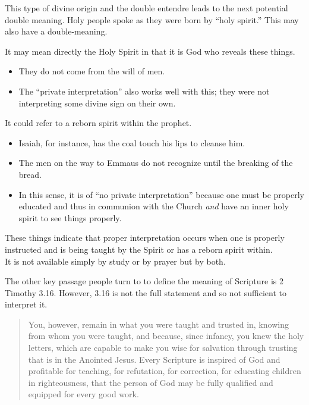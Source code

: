 \documentclass{beamer}
\begin{document}
\begin{frame}
  This type of divine origin and the double entendre leads to the next potential double meaning.
  Holy people spoke as they were born by ``holy spirit.''
  This may also have a double-meaning.
\end{frame}

\begin{frame}
  It may mean directly the Holy Spirit in that it is God who reveals these things.\pause
  \begin{itemize}
	\item They do not come from the will of men.\pause
	\item The ``private interpretation'' also works well with this; they were not interpreting some divine sign on their own.
  \end{itemize}
\end{frame}

\begin{frame}
  It could refer to a reborn spirit within the prophet.\pause
  \begin{itemize}
	\item Isaiah, for instance, has the coal touch his lips to cleanse him.\pause
	\item The men on the way to Emmaus do not recognize until the breaking of the bread.\pause
	\item In this sense, it is of ``no private interpretation'' because one must be properly educated and thus in communion with the Church \emph{and} have an inner holy spirit to see things properly.
  \end{itemize}
\end{frame}

\begin{frame}
  These things indicate that proper interpretation occurs when one is properly instructed and is being taught by the Spirit or has a reborn spirit within.\\ \pause
  It is not available simply by study or by prayer but by both.
\end{frame}

\begin{frame}
  The other key passage people turn to to define the meaning of Scripture is 2 Timothy 3.16.
  However, 3.16 is not the full statement and so not sufficient to interpret it.
  \begin{quote}
	You, however, remain in what you were taught and trusted in, knowing from whom you were taught,
	and because, since infancy, you knew the holy letters, which are capable to make you wise for salvation through trusting that is in the Anointed Jesus.
	Every Scripture is inspired of God and profitable for teaching, for refutation, for correction, for educating children in righteousness,
	that the person of God may be fully qualified and equipped for every good work.
  \end{quote}
\end{frame}
\end{document}
